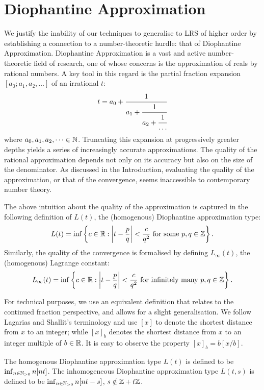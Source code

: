 \section{Diophantine Approximation}
\label{section:diophantine}
We justify the inability of our techniques to generalise to LRS of higher order by establishing a connection to a number-theoretic hurdle: that of Diophantine Approximation. Diophantine Approximation is a vast and active number-theoretic field of research, one of whose concerns is the approximation of reals by rational numbers. A key tool in this regard is the partial fraction expansion $[a_0; a_1, a_2, \dots]$ of an irrational $t$:
$$
t = a_0 + \cfrac{1}{a_1 + \cfrac{1}{a_2 + \cfrac{1}{\dots}}}
$$
where $a_0, a_1, a_2, \dots \in \mathbb{N}$. Truncating this expansion at progressively greater depths yields a series of increasingly accurate approximations. The quality of the rational approximation depends not only on its accuracy but also on the size of the denominator. As discussed in the Introduction, evaluating the quality of the approximation, or that of the convergence, seems inaccessible to contemporary number theory.

The above intuition about the quality of the approximation is captured in the following definition of $L(t)$, the (homogenous) Diophantine approximation type:
\begin{equation}
L(t) = \inf\left\{c \in \mathbb{R} : \left|t - \frac{p}{q}\right| < \frac{c}{q^2} \text{ for some } p, q\in \mathbb{Z}\right\}.
\end{equation}
Similarly, the quality of the convergence is formalised by defining $L_{\infty}(t)$, the (homogenous) Lagrange constant: 
\begin{equation}
L_\infty(t) = \inf\left\{c \in \mathbb{R} : \left|t - \frac{p}{q}\right| < \frac{c}{q^2} \text{ for infinitely many } p, q\in \mathbb{Z}\right\}.
\end{equation}
 
For technical purposes, we use an equivalent definition that relates to the continued fraction perspective, and allows for a slight generalisation. We follow Lagarias and Shallit’s terminology \cite{dio-constants} and use $[x]$ to denote the shortest distance from $x$ to an integer; while $[x]_b$ denotes the shortest distance from $x$ to an integer multiple of $b \in \mathbb{R}$. It is easy to observe the property $[x]_b = b[x/b]$.

\begin{definition}
\label{def:L}
The homogenous Diophantine approximation type $L(t)$ is defined to be $\inf_{n \in \mathbb{N}_{>0}} n[nt]$. The inhomogeneous Diophantine approximation type $L(t, s)$ is defined to be $\inf_{n \in \mathbb{N}_{>0}} n[nt - s]$, $s \notin \mathbb{Z} + t\mathbb{Z}$. 
\end{definition} 

